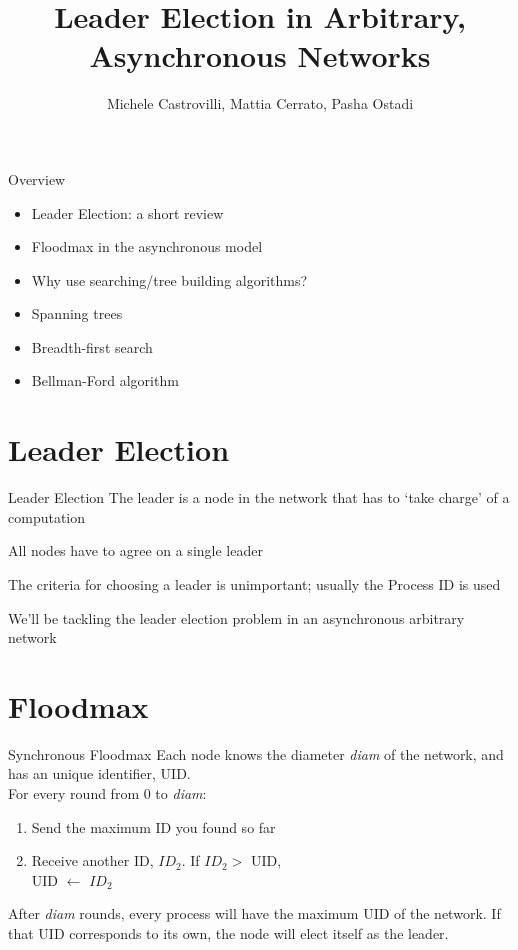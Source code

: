\documentclass[pdf]{beamer}
\title{Leader Election in Arbitrary, Asynchronous Networks}
\author{Michele Castrovilli, Mattia Cerrato, Pasha Ostadi}
\begin{document}
\Large
\begin{frame}
    \maketitle
\end{frame}

\normalsize
\begin{frame}{Overview}
    \begin{itemize}
        \item Leader Election: a short review
        \item Floodmax in the asynchronous model
        \item Why use searching/tree building algorithms?
        \item Spanning trees
        \item Breadth-first search
        \item Bellman-Ford algorithm 
    \end{itemize}
\end{frame}

\section{Leader Election}
\begin{frame}{Leader Election}
    The leader is a node in the network that has to `take charge' of a computation
    
    \vspace{12pt}
    \pause
    All nodes have to agree on a single leader
    
    \vspace{12pt}
    \pause
    The criteria for choosing a leader is unimportant; usually the Process ID is used 
    
    \vspace{12pt}
    \pause
    We'll be tackling the leader election problem in an asynchronous arbitrary network 
\end{frame}

\section{Floodmax}
\begin{frame}{Synchronous Floodmax}
    \vspace{12pt}
    Each node knows the diameter \emph{diam} of the network, and has an unique identifier, UID. \\
    \pause
    For every round from 0 to \emph{diam}:  
    \pause
    \begin{enumerate}
        \item Send the maximum ID you found so far
        \pause
        \item Receive another ID, $ID_{2}$. If $ID_{2} >$ UID, \\
         UID $\leftarrow$ $ID_{2}$ 
    \end{enumerate}
    \pause
    After \emph{diam} rounds, every process will have the maximum UID of the network.
    If that UID corresponds to its own, the node will elect itself as the leader.
\end{frame}
\end{document}
